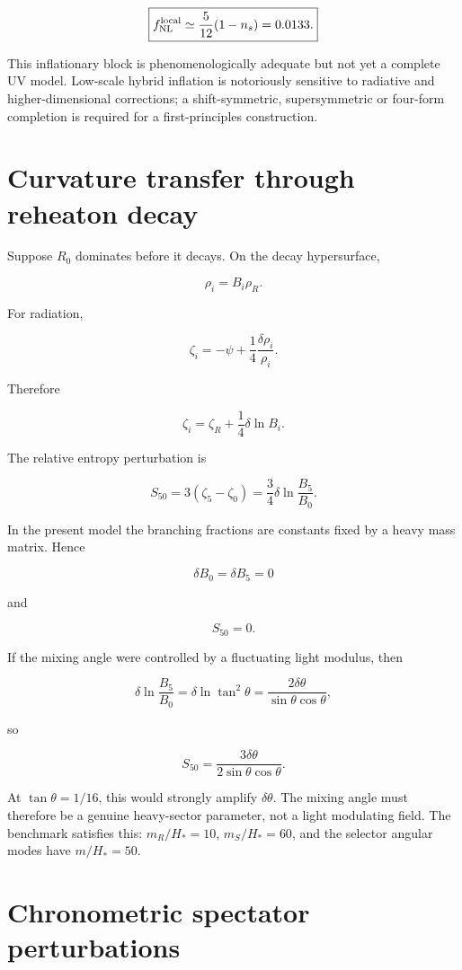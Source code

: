 \documentclass[
  10pt,
]{article}
\begin{document}
\[
\boxed{
f_{\rm NL}^{\rm local}
\simeq
\frac5{12}(1-n_s)
=0.0133.}
\]

This inflationary block is phenomenologically adequate but not yet a
complete UV model. Low-scale hybrid inflation is notoriously sensitive
to radiative and higher-dimensional corrections; a shift-symmetric,
supersymmetric or four-form completion is required for a
first-principles construction.

\section{Curvature transfer through reheaton
decay}\label{curvature-transfer-through-reheaton-decay}

Suppose \(R_0\) dominates before it decays. On the decay hypersurface,

\[
\rho_i=B_i\rho_R.
\]

For radiation,

\[
\zeta_i
=
-\psi
+
\frac14\frac{\delta\rho_i}{\rho_i}.
\]

Therefore

\[
\boxed{
\zeta_i
=
\zeta_R
+
\frac14\delta\ln B_i.
}
\]

The relative entropy perturbation is

\[
S_{50}
=3(\zeta_5-\zeta_0)
=
\frac34
\delta\ln\frac{B_5}{B_0}.
\]

In the present model the branching fractions are constants fixed by a
heavy mass matrix. Hence

\[
\delta B_0=\delta B_5=0
\]

and

\[
\boxed{S_{50}=0.}
\]

If the mixing angle were controlled by a fluctuating light modulus, then

\[
\delta\ln\frac{B_5}{B_0}
=
\delta\ln\tan^2\theta
=
\frac{2\delta\theta}{\sin\theta\cos\theta},
\]

so

\[
S_{50}
=
\frac{3\delta\theta}{2\sin\theta\cos\theta}.
\]

At \(\tan\theta=1/16\), this would strongly amplify \(\delta\theta\).
The mixing angle must therefore be a genuine heavy-sector parameter, not
a light modulating field. The benchmark satisfies this: \(m_R/H_*=10\),
\(m_S/H_*=60\), and the selector angular modes have \(m/H_*=50\).

\section{Chronometric spectator
perturbations}\label{chronometric-spectator-perturbations}
\end{document}
